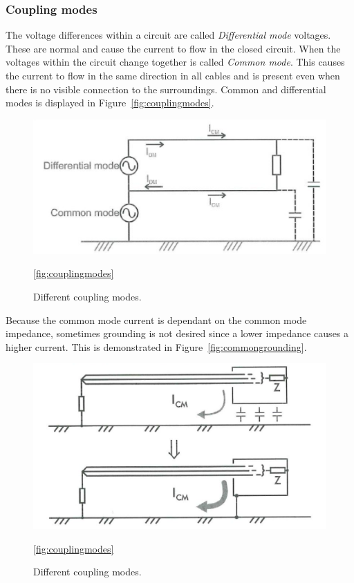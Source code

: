 \subsubsection*{Coupling modes}
The voltage differences within a circuit are called \textit{Differential mode}
voltages. These are normal and cause the current to flow in the closed circuit.
When the voltages within the circuit change together is called \textit{Common
mode}. This causes the current to flow in the same direction in all cables and
is present even when there is no visible connection to the surroundings. Common
and differential modes is displayed in Figure~\ref{fig:couplingmodes}.
\begin{figure}[H]
    \centering
    \includegraphics[scale=0.7]{./figures/FIG_couplingmodes.png}
    \caption{Different coupling modes.}
    \ref{fig:couplingmodes}
\end{figure}
Because the common mode current is dependant on the common mode impedance,
sometimes grounding is not desired since a lower impedance causes a higher
current. This is demonstrated in Figure~\ref{fig:commongrounding}.
\begin{figure}[H]
\centering
\includegraphics[scale=0.7]{./figures/FIG_commongrounding.png}
\caption{Different coupling modes.}
\ref{fig:couplingmodes}
\end{figure}
